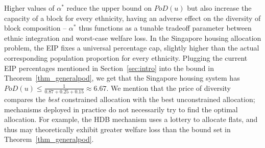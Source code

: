 \documentclass[11pt,dvipdfmx]{article}
\newcommand{\PoD}{\mathit{PoD}}
\begin{document}
Higher values of $\alpha^*$ reduce the upper bound on $\PoD(u)$ but also increase the capacity of a block for every ethnicity, having an adverse effect on the diversity of block composition -- $\alpha^*$ thus functions as a tunable tradeoff parameter between ethnic integration and worst-case welfare loss.
In the Singapore housing allocation problem, the EIP fixes a universal percentage cap, slightly higher than the actual corresponding population proportion for every ethnicity. 
Plugging the current EIP percentages mentioned in Section~\ref{sec:intro} into the bound in Theorem~\ref{thm_generalpod}, we get that the Singapore housing system has $\PoD(u) \leq \frac{1}{0.87 + 0.25  + 0.15} \approx 6.67$. We mention that the price of diversity compares the {\em best} constrained allocation with the best unconstrained allocation; mechanisms deployed in practice do not necessarily try to find the optimal allocation. For example, the HDB mechanism uses a lottery to allocate flats, and thus may theoretically exhibit greater welfare loss than the bound set in Theorem~\ref{thm_generalpod}. 
\end{document}
